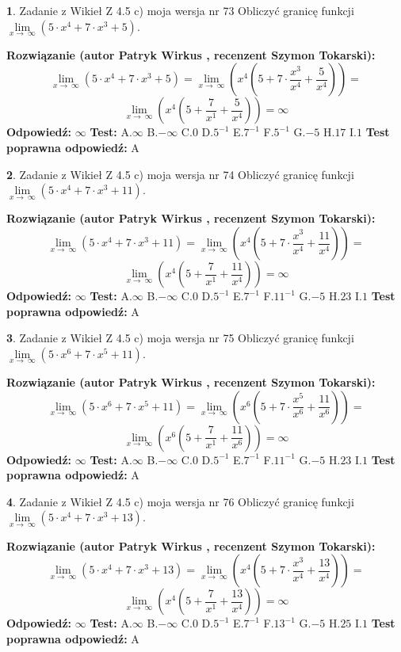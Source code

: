 \documentclass[12pt, a4paper]{article}
\theoremstyle{definition} %
\newtheorem{zad}{}
\newcommand{\zadStart}[1]{\begin{zad}#1\newline}
\newcommand{\zadStop}{\end{zad}}
\newcommand{\rozwStart}[2]{\noindent \textbf{Rozwiązanie (autor #1 , recenzent #2): }\newline}
\newcommand{\rozwStop}{\newline}
\newcommand{\odpStart}{\noindent \textbf{Odpowiedź:}\newline}
\newcommand{\odpStop}{\newline}
\newcommand{\testStart}{\noindent \textbf{Test:}\newline}
\newcommand{\testStop}{\newline}
\newcommand{\kluczStart}{\noindent \textbf{Test poprawna odpowiedź:}\newline}
\newcommand{\kluczStop}{\newline}
\begin{document}
\zadStart{Zadanie z Wikieł Z 4.5 c) moja wersja nr 73}
Obliczyć granicę funkcji  $\lim\limits_{x\to\ \infty}(5 \cdot x^{4}+7 \cdot x^{3}+5)$.
\zadStop
\rozwStart{Patryk Wirkus}{Szymon Tokarski}
$$\lim\limits_{x\to\ \infty}(5 \cdot x^{4}+7 \cdot x^{3}+5) = \lim\limits_{x\to\ \infty}(x^{4}(5 +7 \cdot \frac{x^{3}}{x^{4}}+\frac{5}{x^{4}})) =$$ $$\lim\limits_{x\to\ \infty}(x^{4}(5 +\frac{7}{x^{1}}+\frac{5}{x^{4}})) =\infty$$
\rozwStop
\odpStart
$\infty$
\odpStop
\testStart
A.$\infty$ B.$-\infty$ C.$0$ D.$5^{-1}$ E.$7^{-1}$
F.$5^{-1}$ G.$-5$
H.$17$
I.$1$
\testStop
\kluczStart
A
\kluczStop



\zadStart{Zadanie z Wikieł Z 4.5 c) moja wersja nr 74}
Obliczyć granicę funkcji  $\lim\limits_{x\to\ \infty}(5 \cdot x^{4}+7 \cdot x^{3}+11)$.
\zadStop
\rozwStart{Patryk Wirkus}{Szymon Tokarski}
$$\lim\limits_{x\to\ \infty}(5 \cdot x^{4}+7 \cdot x^{3}+11) = \lim\limits_{x\to\ \infty}(x^{4}(5 +7 \cdot \frac{x^{3}}{x^{4}}+\frac{11}{x^{4}})) =$$ $$\lim\limits_{x\to\ \infty}(x^{4}(5 +\frac{7}{x^{1}}+\frac{11}{x^{4}})) =\infty$$
\rozwStop
\odpStart
$\infty$
\odpStop
\testStart
A.$\infty$ B.$-\infty$ C.$0$ D.$5^{-1}$ E.$7^{-1}$
F.$11^{-1}$ G.$-5$
H.$23$
I.$1$
\testStop
\kluczStart
A
\kluczStop



\zadStart{Zadanie z Wikieł Z 4.5 c) moja wersja nr 75}
Obliczyć granicę funkcji  $\lim\limits_{x\to\ \infty}(5 \cdot x^{6}+7 \cdot x^{5}+11)$.
\zadStop
\rozwStart{Patryk Wirkus}{Szymon Tokarski}
$$\lim\limits_{x\to\ \infty}(5 \cdot x^{6}+7 \cdot x^{5}+11) = \lim\limits_{x\to\ \infty}(x^{6}(5 +7 \cdot \frac{x^{5}}{x^{6}}+\frac{11}{x^{6}})) =$$ $$\lim\limits_{x\to\ \infty}(x^{6}(5 +\frac{7}{x^{1}}+\frac{11}{x^{6}})) =\infty$$
\rozwStop
\odpStart
$\infty$
\odpStop
\testStart
A.$\infty$ B.$-\infty$ C.$0$ D.$5^{-1}$ E.$7^{-1}$
F.$11^{-1}$ G.$-5$
H.$23$
I.$1$
\testStop
\kluczStart
A
\kluczStop



\zadStart{Zadanie z Wikieł Z 4.5 c) moja wersja nr 76}
Obliczyć granicę funkcji  $\lim\limits_{x\to\ \infty}(5 \cdot x^{4}+7 \cdot x^{3}+13)$.
\zadStop
\rozwStart{Patryk Wirkus}{Szymon Tokarski}
$$\lim\limits_{x\to\ \infty}(5 \cdot x^{4}+7 \cdot x^{3}+13) = \lim\limits_{x\to\ \infty}(x^{4}(5 +7 \cdot \frac{x^{3}}{x^{4}}+\frac{13}{x^{4}})) =$$ $$\lim\limits_{x\to\ \infty}(x^{4}(5 +\frac{7}{x^{1}}+\frac{13}{x^{4}})) =\infty$$
\rozwStop
\odpStart
$\infty$
\odpStop
\testStart
A.$\infty$ B.$-\infty$ C.$0$ D.$5^{-1}$ E.$7^{-1}$
F.$13^{-1}$ G.$-5$
H.$25$
I.$1$
\testStop
\kluczStart
A
\kluczStop
\end{document}
